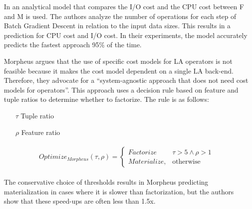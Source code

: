 In \cite{orion_learning_gen_lin_models} an analytical model that compares the I/O cost and the CPU cost between F and M is used. The authors analyze the number of operations for each step of Batch Gradient Descent in relation to the input data sizes. This results in a prediction for CPU cost and I/O cost. In their experiments, the model accurately predicts the fastest approach 95\% of the time.

Morpheus \cite{morpheus} argues that the use of specific cost models for LA operators is not feasible because it makes the cost model dependent on a single LA back-end. Therefore, they advocate for a “system-agnostic approach that does not need cost models for operators”. This approach uses a decision rule based on feature and tuple ratios to determine whether to factorize. The rule is as follows:

\begin{definition}
    \begin{itemize}
        \item[]
        \item[$\tau$] Tuple ratio
        \item[$\rho$] Feature ratio
    \end{itemize}

    \begin{align*}
        \begin{split}
            Optimize_{Morpheus}(\tau, \rho) =
            \begin{cases}
                Factorize    & \tau > 5 \wedge \rho > 1 \\
                Materialize, & \text{otherwise}
            \end{cases}
        \end{split}
    \end{align*}
\end{definition}

The conservative choice of thresholds results in Morpheus predicting materialization in cases where it is slower than factorization, but the authors show that these speed-ups are often less than 1.5x.

